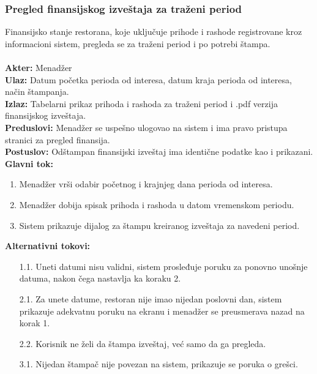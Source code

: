 \documentclass{article}
\begin{document}
\subsubsection{Pregled finansijskog izveštaja za traženi period}
Finansijsko stanje restorana, koje uključuje prihode i rashode registrovane kroz informacioni sistem, pregleda se za traženi period i po potrebi štampa.\\\\
\textbf{Akter:} Menadžer\\
\textbf{Ulaz:} Datum početka perioda od interesa, datum kraja perioda od interesa, način štampanja.\\
\textbf{Izlaz:} Tabelarni prikaz prihoda i rashoda za traženi period i .pdf verzija finansijskog izveštaja.\\
\textbf{Preduslovi:} Menadžer se uspešno ulogovao na sistem i  ima pravo pristupa stranici za pregled finansija.\\
\textbf{Postuslov:} Odštampan finansijski izveštaj ima identične podatke kao i prikazani.\\
\textbf{Glavni tok:}
\begin{enumerate}
\item Menadžer vrši odabir početnog i krajnjeg dana perioda od interesa.
\item Menadžer dobija spisak prihoda i rashoda u datom vremenskom periodu.
\item Sistem prikazuje dijalog za štampu kreiranog izveštaja za navedeni period.
\end{enumerate}
\textbf{Alternativni tokovi:}\\
\begin{itemize}
\item [1.1.] Uneti datumi nisu validni, sistem prosleđuje poruku za ponovno unošnje datuma, nakon čega nastavlja ka koraku 2.
\item [2.1.] Za unete datume, restoran nije imao nijedan poslovni dan, sistem prikazuje adekvatnu poruku na ekranu i menadžer se preusmerava nazad na korak 1.
\item [2.2.] Korisnik ne želi da štampa izveštaj, već samo da ga pregleda.
\item [3.1.] Nijedan štampač nije povezan na sistem, prikazuje se poruka o grešci.
\end{itemize}
       
\end{document}
